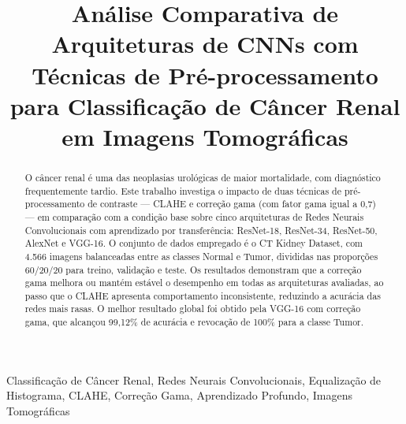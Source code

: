 \documentclass[conference]{IEEEtran}
\begin{document}
\title{Análise Comparativa de Arquiteturas de CNNs com Técnicas de
Pré-processamento para Classificação de Câncer Renal em Imagens
Tomográficas}

\author{
\and
{}
}

\maketitle

\begin{abstract}
O câncer renal é uma das neoplasias urológicas de maior mortalidade, com
diagnóstico frequentemente tardio. Este trabalho investiga o impacto de duas
técnicas de pré-processamento de contraste --- CLAHE e correção gama
(com fator gama igual a 0,7) --- em comparação com a condição base sobre cinco
arquiteturas de Redes Neurais Convolucionais com aprendizado por
transferência: ResNet-18, ResNet-34, ResNet-50, AlexNet e VGG-16.
O conjunto de dados empregado é o CT Kidney Dataset, com 4.566 imagens
balanceadas entre as classes Normal e Tumor, divididas nas proporções
60/20/20 para treino, validação e teste. Os resultados demonstram que a
correção gama melhora ou mantém estável o desempenho em todas as arquiteturas
avaliadas, ao passo que o CLAHE apresenta comportamento inconsistente,
reduzindo a acurácia das redes mais rasas. O melhor resultado global foi
obtido pela VGG-16 com correção gama, que alcançou 99,12\% de acurácia
e revocação de 100\% para a classe Tumor.
\end{abstract}

\begin{IEEEkeywords}
Classificação de Câncer Renal, Redes Neurais Convolucionais, Equalização de
Histograma, CLAHE, Correção Gama, Aprendizado Profundo, Imagens Tomográficas
\end{IEEEkeywords}
\end{document}
